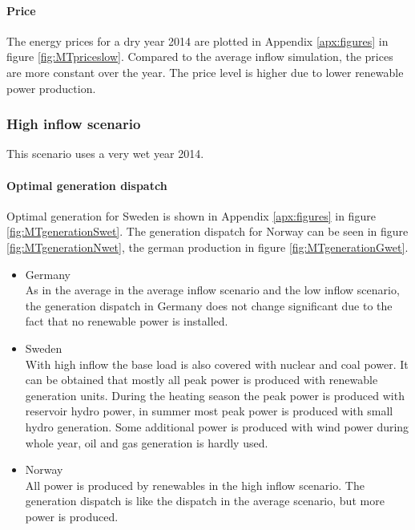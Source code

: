 \documentclass{article}
\begin{document}
\paragraph{Price\\}
The energy prices for a dry year 2014 are plotted in Appendix \ref{apx:figures} in figure \ref{fig:MTpriceslow}. Compared to the average inflow simulation, the prices are more constant over the year. The price level is higher due to lower renewable power production.

\subsubsection{High inflow scenario}
This scenario uses a very wet year 2014. 
\paragraph{Optimal generation dispatch\\}
Optimal generation for Sweden is shown in Appendix \ref{apx:figures} in figure \ref{fig:MTgenerationSwet}. The generation dispatch for Norway can be seen in figure \ref{fig:MTgenerationNwet}, the german production in figure \ref{fig:MTgenerationGwet}.
\begin{itemize}
\item Germany\\
As in the average in the average inflow scenario and the low inflow scenario, the generation dispatch in Germany does not change significant due to the fact that no renewable power is installed.
\item Sweden\\
With high inflow the base load is also covered with nuclear and coal power. It can be obtained that mostly all peak power is produced with renewable generation units. During the heating season the peak power is produced with reservoir hydro power, in summer most peak power is produced with small hydro generation. Some additional power is produced with wind power during whole year, oil and gas generation is hardly used.
\item Norway\\
All power is produced by renewables in the high inflow scenario. The generation dispatch is like the dispatch in the average scenario, but more power is produced.
\end{itemize}
\end{document}
